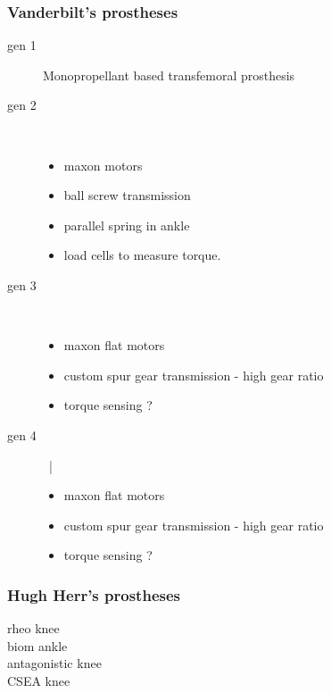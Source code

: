 \subsubsection{Vanderbilt's prostheses}
    \begin{description}
        \item[gen 1] Monopropellant based transfemoral prosthesis
        \item[gen 2] \phantom{text} ~\\
        \begin{itemize}
                \item maxon motors
                \item ball screw transmission
                \item parallel spring in ankle
                \item load cells to measure torque.
            \end{itemize}
        \item[gen 3] ~\\
            \begin{itemize}
                \item maxon flat motors
                \item custom spur gear transmission - high gear ratio
                \item torque sensing ?
            \end{itemize}
        \item[gen 4] ~|\
            \begin{itemize}
                \item maxon flat motors
                \item custom spur gear transmission - high gear ratio
                \item torque sensing ?
            \end{itemize}
    \end{description}
\subsubsection{Hugh Herr's prostheses}
    \begin{description}
        \item[rheo knee]
        \item[biom ankle]
        \item[antagonistic knee]
        \item[CSEA knee]
    \end{description}
